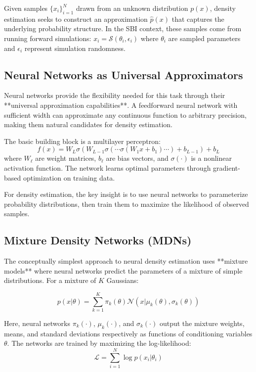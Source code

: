 \documentclass[11pt,a4paper]{article}
\theoremstyle{definition}
\begin{document}
Given samples $\{x_i\}_{i=1}^N$ drawn from an unknown distribution $p(x)$, density estimation seeks to construct an approximation $\hat{p}(x)$ that captures the underlying probability structure. In the SBI context, these samples come from running forward simulations: $x_i = \mathcal{S}(\theta_i, \epsilon_i)$ where $\theta_i$ are sampled parameters and $\epsilon_i$ represent simulation randomness.

\subsection{Neural Networks as Universal Approximators}

Neural networks provide the flexibility needed for this task through their **universal approximation capabilities**. A feedforward neural network with sufficient width can approximate any continuous function to arbitrary precision, making them natural candidates for density estimation.

The basic building block is a multilayer perceptron:
\begin{equation}
    f(x) = W_L \sigma(W_{L-1} \sigma(\cdots \sigma(W_1 x + b_1) \cdots) + b_{L-1}) + b_L
\end{equation}
where $W_\ell$ are weight matrices, $b_\ell$ are bias vectors, and $\sigma(\cdot)$ is a nonlinear activation function. The network learns optimal parameters through gradient-based optimization on training data.

For density estimation, the key insight is to use neural networks to parameterize probability distributions, then train them to maximize the likelihood of observed samples.

\subsection{Mixture Density Networks (MDNs)}

The conceptually simplest approach to neural density estimation uses **mixture models** where neural networks predict the parameters of a mixture of simple distributions. For a mixture of $K$ Gaussians:

\begin{equation}
    p(x|\theta) = \sum_{k=1}^K \pi_k(\theta) \mathcal{N}(x | \mu_k(\theta), \sigma_k(\theta))
\end{equation}

Here, neural networks $\pi_k(\cdot)$, $\mu_k(\cdot)$, and $\sigma_k(\cdot)$ output the mixture weights, means, and standard deviations respectively as functions of conditioning variables $\theta$. The networks are trained by maximizing the log-likelihood:
\begin{equation}
    \mathcal{L} = \sum_{i=1}^N \log p(x_i|\theta_i)
\end{equation}
\end{document}
